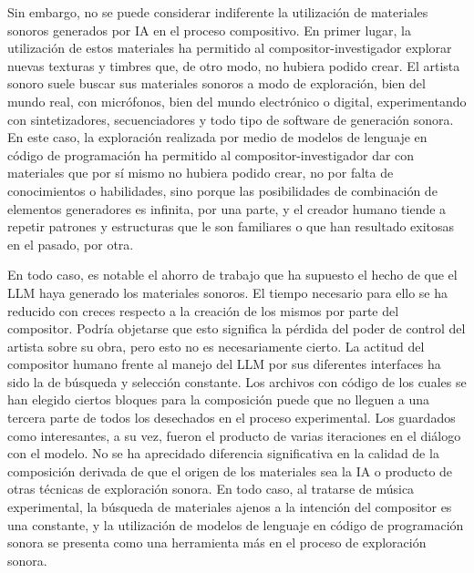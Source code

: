 Sin embargo, no se puede considerar indiferente la utilización de materiales sonoros generados por IA en el proceso compositivo. En primer lugar, la utilización de estos materiales ha permitido al compositor-investigador explorar nuevas texturas y timbres que, de otro modo, no hubiera podido crear. El artista sonoro suele buscar sus materiales sonoros a modo de exploración, bien del mundo real, con micrófonos, bien del mundo electrónico o digital, experimentando con sintetizadores, secuenciadores y todo tipo de software de generación sonora. En este caso, la exploración realizada por medio de modelos de lenguaje en código de programación ha permitido al compositor-investigador dar con materiales que por sí mismo no hubiera podido crear, no por falta de conocimientos o habilidades, sino porque las posibilidades de combinación de elementos generadores es infinita, por una parte, y el creador humano tiende a repetir patrones y estructuras que le son familiares o que han resultado exitosas en el pasado, por otra.

En todo caso, es notable el ahorro de trabajo que ha supuesto el hecho de que el LLM haya generado los materiales sonoros. El tiempo necesario para ello se ha reducido con creces respecto a la creación de los mismos por parte del compositor. Podría objetarse que esto significa la pérdida del poder de control del artista sobre su obra, pero esto no es necesariamente cierto. La actitud del compositor humano frente al manejo del LLM por sus diferentes interfaces ha sido la de búsqueda y selección constante. Los archivos con código de los cuales se han elegido ciertos bloques para la composición puede que no lleguen a una tercera parte de todos los desechados en el proceso experimental. Los guardados como interesantes, a su vez, fueron el producto de varias iteraciones en el diálogo con el modelo. No se ha aprecidado diferencia significativa en la calidad de la composición derivada de que el origen de los materiales sea la IA o producto de otras técnicas de exploración sonora. En todo caso, al tratarse de música experimental, la búsqueda de materiales ajenos a la intención del compositor es una constante, y la utilización de modelos de lenguaje en código de programación sonora se presenta como una herramienta más en el proceso de exploración sonora.

